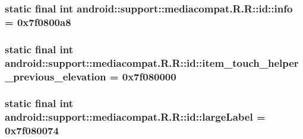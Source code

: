 \hypertarget{classandroid_1_1support_1_1mediacompat_1_1_r_1_1id_919fb5d4c70370c1355dbf5509d7c3e2}{
\subsubsection[{info}]{\setlength{\rightskip}{0pt plus 5cm}static final int android::support::mediacompat.R.R::id::info = 0x7f0800a8}}
\label{classandroid_1_1support_1_1mediacompat_1_1_r_1_1id_919fb5d4c70370c1355dbf5509d7c3e2}


\hypertarget{classandroid_1_1support_1_1mediacompat_1_1_r_1_1id_3645b24ed08d78d20e7bfed82c92da6a}{
\subsubsection[{item\_\-touch\_\-helper\_\-previous\_\-elevation}]{\setlength{\rightskip}{0pt plus 5cm}static final int android::support::mediacompat.R.R::id::item\_\-touch\_\-helper\_\-previous\_\-elevation = 0x7f080000}}
\label{classandroid_1_1support_1_1mediacompat_1_1_r_1_1id_3645b24ed08d78d20e7bfed82c92da6a}


\hypertarget{classandroid_1_1support_1_1mediacompat_1_1_r_1_1id_69ed23072620cbefa479d130388d651a}{
\subsubsection[{largeLabel}]{\setlength{\rightskip}{0pt plus 5cm}static final int android::support::mediacompat.R.R::id::largeLabel = 0x7f080074}}
\label{classandroid_1_1support_1_1mediacompat_1_1_r_1_1id_69ed23072620cbefa479d130388d651a}



